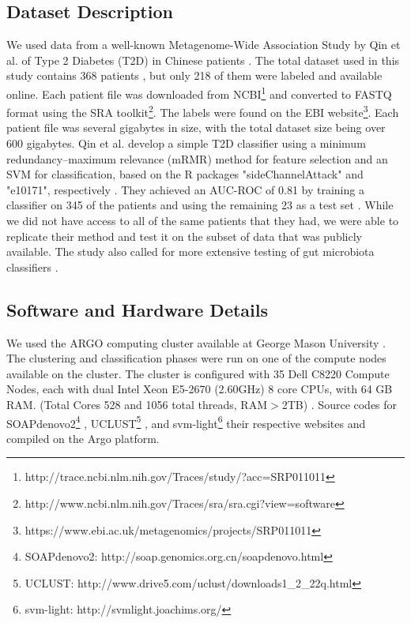 \subsection{Dataset Description}

We used data from a well-known Metagenome-Wide Association Study by Qin et al. of Type 2 Diabetes (T2D) in Chinese patients \cite{qin041012}. The total dataset used in this study contains 368 patients \cite{qin041012}, but only 218 of them were labeled and available online. Each patient file was downloaded from NCBI\footnote{http://trace.ncbi.nlm.nih.gov/Traces/study/?acc=SRP011011}
and converted to FASTQ format using the SRA toolkit\footnote{http://www.ncbi.nlm.nih.gov/Traces/sra/sra.cgi?view=software}.
The labels were found on the EBI website\footnote{https://www.ebi.ac.uk/metagenomics/projects/SRP011011}. Each patient file was several gigabytes in size, with the total dataset size being over 600 gigabytes. Qin et al. develop a simple T2D classifier using a minimum redundancy–maximum relevance (mRMR) method \cite{peng05} for feature selection and an SVM for classification, based on the R packages "sideChannelAttack" and "e10171", respectively \cite{qin041012}. They achieved an AUC-ROC of 0.81 by training a classifier on 345 of the patients and using the remaining 23 as a test set \cite{qin041012}. While we did not have access to all of the same patients that they had, we were able to replicate their method and test it on the subset of data that was publicly available. The study also called for more extensive testing of gut microbiota classifiers \cite{qin041012}.

\subsection{Software and Hardware Details}
We used the ARGO computing cluster available at George Mason University \cite{argo}. The clustering and classification phases were run on one of the compute nodes available on the cluster. The cluster is configured with 35 Dell C8220 Compute Nodes, each with dual Intel Xeon E5-2670 (2.60GHz) 8 core CPUs, with 64 GB RAM. (Total Cores 528 and 1056 total threads, RAM$>$2TB) \cite{argo}. Source codes for 
SOAPdenovo2\footnote{SOAPdenovo2: http://soap.genomics.org.cn/soapdenovo.html} \cite{luo12}, UCLUST\footnote{UCLUST: http://www.drive5.com/uclust/downloads1\_{}2\_{}22q.html}    \cite{Edgar10}, and svm-light\footnote{svm-light: http://svmlight.joachims.org/} \cite{joachims08}
their respective websites
 and compiled on the Argo platform. 

